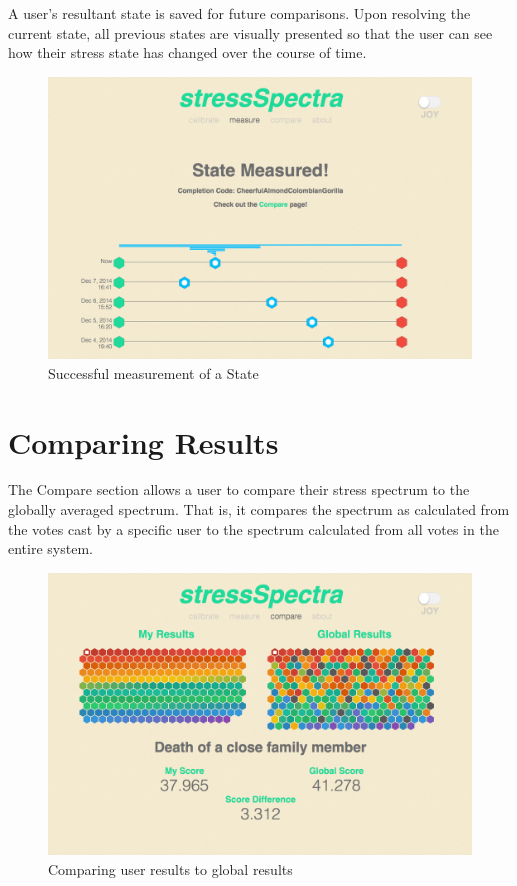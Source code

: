 \documentclass{sigchi}
\begin{document}
A user’s resultant state is saved for future comparisons. Upon resolving the current state, all previous states are visually presented so that the user can see how their stress state has changed over the course of time.  
\begin{figure}[!h]
\centering
\includegraphics[width=0.9\columnwidth]{measure2}
\caption{Successful measurement of a State}
\label{fig:calibrate}
\end{figure}

\section{Comparing Results}
The Compare section allows a user to compare their stress spectrum to the globally averaged spectrum. That is, it compares the spectrum as calculated from the votes cast by a specific user to the spectrum calculated from all votes in the entire system.
\begin{figure}[!h]
\centering
\includegraphics[width=0.9\columnwidth]{compare}
\caption{Comparing user results to global results}
\label{fig:calibrate}
\end{figure}
\end{document}
